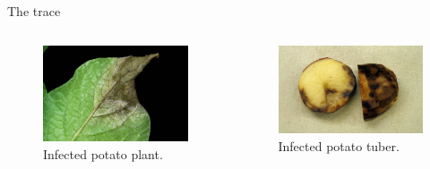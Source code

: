 \documentclass[aspectratio=169]{beamer}
\begin{document}
\begin{frame}{The trace}
\begin{columns}
    \begin{column}{0.5\textwidth}
        \begin{figure}
            \centering
            \includegraphics[width=1.0\textwidth]{figures/infestans_leaf.jpg}
            \caption{Infected potato plant\footnotemark{}.}
            \label{fig:infestans_leaf}
        \end{figure}
    \end{column}
    \begin{column}{0.5\textwidth}
        \begin{figure}
            \centering
            \includegraphics[width=1.0\textwidth]{figures/infestans_potato.jpg}
            \caption{Infected potato tuber\footnotemark{}.}
            \label{fig:infestans_tuber}
        \end{figure}
    \end{column}
\end{columns}
\end{frame}
\end{document}
